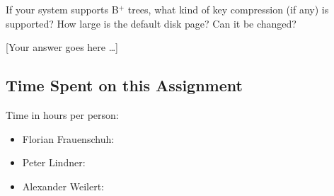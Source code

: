 \documentclass[11pt]{scrartcl}
\newcommand{\youranswerhere}{[Your answer goes here \ldots]}
\begin{document}
If your system supports B$^+$ trees, what kind of key compression (if any) is supported? How large is the default disk page? Can it be changed?

\youranswerhere{}

\subsection*{Time Spent on this Assignment}

Time in hours per person:
\begin{itemize}
  \item Florian Frauenschuh: \textbf{}
  \item Peter Lindner: \textbf{}
  \item Alexander Weilert: \textbf{}
\end{itemize}

\pagebreak

\printbibliography[title=References]
\end{document}
